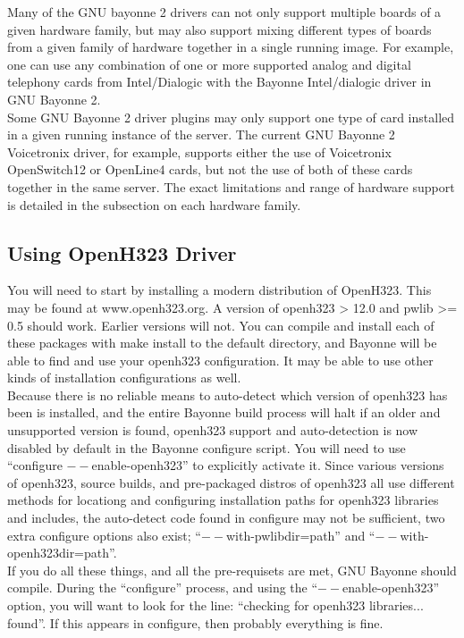 \documentclass[a4paper,12pt]{article}
\begin{document}
Many of the GNU bayonne 2 drivers can not only support multiple boards of a
given hardware family, but may also support mixing different types of
boards from a given family of hardware together in a single running image.
For example, one can use any combination of one or more supported analog
and digital telephony cards from Intel/Dialogic with the Bayonne
Intel/dialogic driver in GNU Bayonne 2. \\

Some GNU Bayonne 2 driver plugins may only support one type of card
installed in a given running instance of the server.  The current GNU
Bayonne 2 Voicetronix driver, for example, supports either the use of
Voicetronix OpenSwitch12 or OpenLine4 cards, but not the use of both of
these cards together in the same server.  The exact limitations and range
of hardware support is detailed in the subsection on each hardware family. \\

\subsection{Using OpenH323 Driver}

You will need to start by installing a modern distribution of OpenH323.
This may be found at www.openh323.org.  A version of openh323 > 12.0
and pwlib >= 0.5 should work.  Earlier versions will not.  You can compile
and install each of these packages with make install to the default
directory, and Bayonne will be able to find and use your openh323
configuration.  It may be able to use other kinds of installation
configurations as well. \\

Because there is no reliable means to auto-detect which version of openh323
has been is installed, and the entire Bayonne build process will halt if
an older and unsupported version is found, openh323 support and
auto-detection is now disabled by default in the Bayonne configure
script.  You will need to use ``configure $--$enable-openh323'' to
explicitly activate it.  Since various versions of openh323, source
builds, and pre-packaged distros of openh323 all use different methods
for locationg and configuring installation paths for openh323 libraries
and includes, the auto-detect code found in configure may not be
sufficient, two extra configure options also exist;
``$--$with-pwlibdir=path'' and ``$--$with-openh323dir=path''. \\

If you do all these things, and all the pre-requisets are met, GNU
Bayonne should compile.  During the ``configure'' process, and using the
``$--$enable-openh323'' option, you will want to look for the line:
``checking for openh323 libraries... found''.  If this appears in
configure, then probably everything is fine. \\
\end{document}
